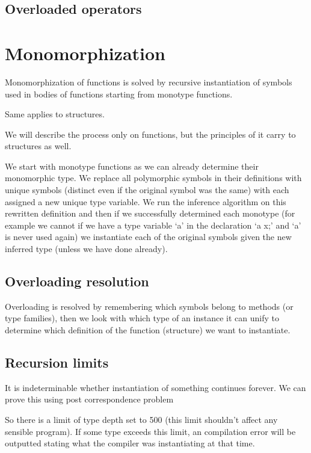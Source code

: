 \subsection{Overloaded operators}

\section{Monomorphization}

Monomorphization of functions is solved by recursive instantiation of symbols used in bodies of functions
starting from monotype functions.

Same applies to structures.

We will describe the process only on functions, but the principles of it carry to structures as well.

We start with monotype functions as we can already determine their monomorphic type. We replace all polymorphic
symbols in their definitions with unique symbols (distinct even if the original symbol was the same) with each
assigned a new unique type variable. We run the inference algorithm on this rewritten definition and then if
we successfully determined each monotype (for example we cannot if we have a type variable `a' in the declaration `a x;'
and `a' is never used again) we instantiate each of the original symbols given the new inferred type (unless we have done already).

\subsection{Overloading resolution}

Overloading is resolved by remembering which symbols belong to methods (or type families), then we look with which type of an
instance it can unify to determine which definition of the function (structure) we want to instantiate.

\subsection{Recursion limits}

It is indeterminable whether instantiation of something continues forever. We can prove this using post correspondence problem %

So there is a limit of type depth set to 500 (this limit shouldn't affect any sensible program).
If some type exceeds this limit, an compilation error will be outputted stating what the compiler was instantiating
at that time.

